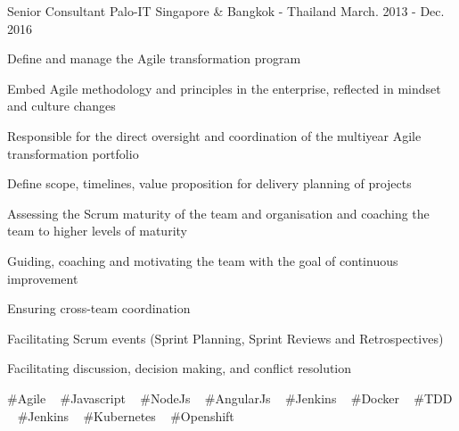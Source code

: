 \begin{cventries}
  \cventry
    {Senior Consultant} %
    {Palo-IT} %
    {Singapore \& Bangkok - Thailand} %
    {March. 2013 - Dec. 2016} %
    {
      \begin{cvitems} %
        \item {Define and manage the Agile transformation program}
        \item {Embed Agile methodology and principles in the enterprise, reflected in mindset and culture changes}
        \item {Responsible for the direct oversight and coordination of the multiyear Agile transformation portfolio}
        \item {Define scope, timelines, value proposition for delivery planning of projects}
        \item {Assessing the Scrum maturity of the team and organisation and coaching the team to higher levels of maturity}
        \item {Guiding, coaching and motivating the team with the goal of continuous improvement}
        \item {Ensuring cross-team coordination}
        \item {Facilitating Scrum events (Sprint Planning, Sprint Reviews and Retrospectives)}
        \item {Facilitating discussion, decision making, and conflict resolution}
      \end{cvitems}
    }
    {
      \#Agile ~
      \#Javascript ~
      \#NodeJs ~
      \#AngularJs ~
      \#Jenkins ~
      \#Docker ~
      \#TDD ~
      \#Jenkins ~
      \#Kubernetes ~
      \#Openshift
    }


\end{cventries}
